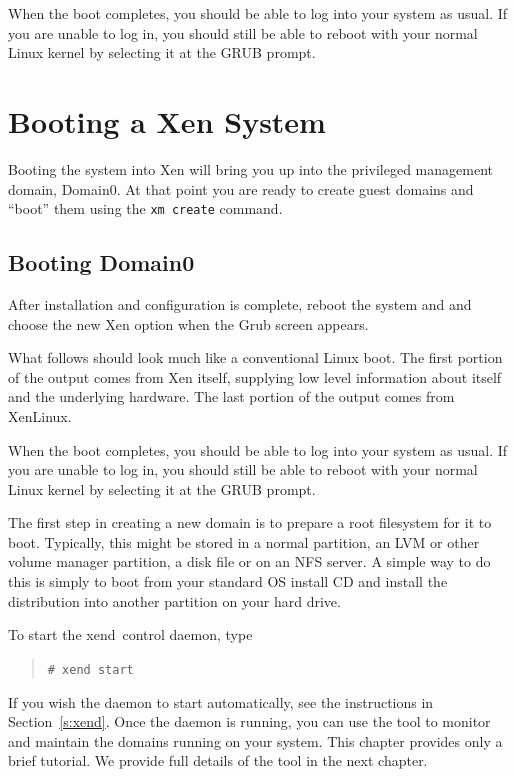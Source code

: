 \documentclass[11pt,twoside,final,openright]{report}
\def\xend{{xend}\xspace}
\begin{document}
When the boot completes, you should be able to log into your system as
usual. If you are unable to log in, you should still be able to reboot
with your normal Linux kernel by selecting it at the GRUB prompt.


\chapter{Booting a Xen System}

Booting the system into Xen will bring you up into the privileged
management domain, Domain0. At that point you are ready to create
guest domains and ``boot'' them using the \texttt{xm create} command.

\section{Booting Domain0}

After installation and configuration is complete, reboot the system
and and choose the new Xen option when the Grub screen appears.

What follows should look much like a conventional Linux boot.  The
first portion of the output comes from Xen itself, supplying low level
information about itself and the underlying hardware.  The last
portion of the output comes from XenLinux.


When the boot completes, you should be able to log into your system as
usual.  If you are unable to log in, you should still be able to
reboot with your normal Linux kernel by selecting it at the GRUB prompt.

The first step in creating a new domain is to prepare a root
filesystem for it to boot.  Typically, this might be stored in a normal
partition, an LVM or other volume manager partition, a disk file or on
an NFS server.  A simple way to do this is simply to boot from your
standard OS install CD and install the distribution into another
partition on your hard drive.

To start the \xend\ control daemon, type
\begin{quote}
  \verb!# xend start!
\end{quote}

If you wish the daemon to start automatically, see the instructions in
Section~\ref{s:xend}. Once the daemon is running, you can use the
 tool to monitor and maintain the domains running on your
system. This chapter provides only a brief tutorial. We provide full
details of the  tool in the next chapter.
\end{document}
